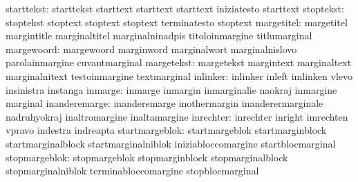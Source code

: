                       starttekst: starttekst                       starttext
                                  starttext                        starttext
                                  iniziatesto                      starttext
                       stoptekst: stoptekst                        stoptext
                                  stoptext                         stoptext
                                  terminatesto                     stoptext
                      margetitel: margetitel                       margintitle
                                  marginaltitel                    marginalninadpis
                                  titoloinmargine                  titlumarginal
                      margewoord: margewoord                       marginword
                                  marginalwort                     marginalnislovo
                                  parolainmargine                  cuvantmarginal
                      margetekst: margetekst                       margintext
                                  marginaltext                     marginalnitext
                                  testoinmargine                   textmarginal
                        inlinker: inlinker                         inleft
                                  imlinken                         vlevo
                                  insinistra                       instanga
                         inmarge: inmarge                          inmargin
                                  inmarginalie                     naokraj
                                  inmargine                        marginal
                   inanderemarge: inanderemarge                    inothermargin
                                  inanderermarginale               nadruhyokraj
                                  inaltromargine                   inaltamargine
                       inrechter: inrechter                        inright
                                  imrechten                        vpravo
                                  indestra                         indreapta
                  startmargeblok: startmargeblok                   startmarginblock
                                  startmarginalblock               startmarginalniblok
                                  iniziabloccomargine              startblocmarginal
                   stopmargeblok: stopmargeblok                    stopmarginblock
                                  stopmarginalblock                stopmarginalniblok
                                  terminabloccomargine             stopblocmarginal
